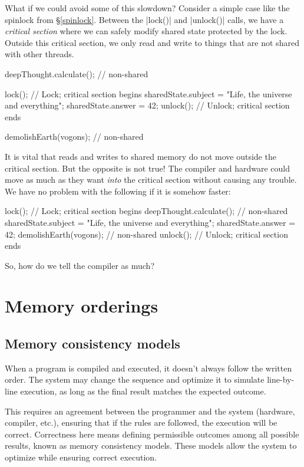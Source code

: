 \documentclass[fontsize=10pt, oneside]{scrartcl}
\newcommand{\introduce}[1]{\textit{#1}}
\newcommand{\secref}[1]{\hyperref[#1]{\textsc{\S}\ref*{#1}}}
\begin{document}
What if we could avoid some of this slowdown?
Consider a simple case like the spinlock from \secref{spinlock}.
Between the \cc|lock()| and \cc|unlock()| calls,
we have a \introduce{critical section} where we can safely modify shared state protected by the lock.
Outside this critical section,
we only read and write to things that are not shared with other threads.
\begin{cppcode}
deepThought.calculate(); // non-shared

lock(); // Lock; critical section begins
sharedState.subject = "Life, the universe and everything";
sharedState.answer = 42;
unlock(); // Unlock; critical section ends

demolishEarth(vogons); // non-shared
\end{cppcode}

It is vital that reads and writes to shared memory do not move outside the critical section.
But the opposite is not true!
The compiler and hardware could move as much as they want \emph{into} the critical section without causing any trouble.
We have no problem with the following if it is somehow faster:
\begin{cppcode}
lock(); // Lock; critical section begins
deepThought.calculate(); // non-shared
sharedState.subject = "Life, the universe and everything";
sharedState.answer = 42;
demolishEarth(vogons); // non-shared
unlock(); // Unlock; critical section ends
\end{cppcode}
So, how do we tell the compiler as much?

\section{Memory orderings}

\subsection{Memory consistency models}

When a program is compiled and executed, it doesn't always follow the written order.
The system may change the sequence and optimize it to simulate line-by-line execution, as long as the final result matches the expected outcome.

This requires an agreement between the programmer and the system (hardware, compiler, etc.), ensuring that if the rules are followed, the execution will be correct.
Correctness here means defining permissible outcomes among all possible results, known as memory consistency models.
These models allow the system to optimize while ensuring correct execution.
\end{document}
